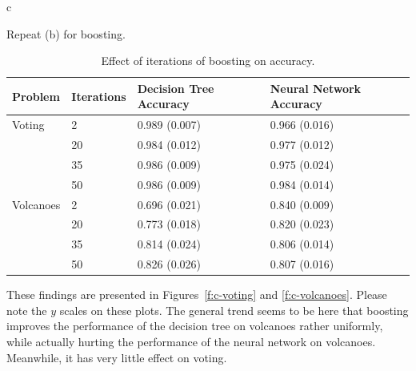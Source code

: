 \documentclass[fleqn]{homework}
\begin{document}
  \begin{problem}{c}
    \begin{question}
      Repeat (b) for boosting.
    \end{question}

    \begin{table}[h]
      \centering
      \caption{Effect of iterations of boosting on accuracy.}
      \label{t:c}
      \begin{tabular}{ll|ll}
        \toprule
        Problem   & Iterations & Decision Tree Accuracy & Neural Network Accuracy \\
        \midrule
        Voting    & 2          & 0.989 (0.007)          & 0.966 (0.016)            \\
                  & 20         & 0.984 (0.012)          & 0.977 (0.012)            \\
                  & 35         & 0.986 (0.009)          & 0.975 (0.024)            \\
                  & 50         & 0.986 (0.009)          & 0.984 (0.014)            \\
        \midrule
        Volcanoes & 2          & 0.696 (0.021)          & 0.840 (0.009)            \\
                  & 20         & 0.773 (0.018)          & 0.820 (0.023)            \\
                  & 35         & 0.814 (0.024)          & 0.806 (0.014)            \\
                  & 50         & 0.826 (0.026)          & 0.807 (0.016)            \\
        \bottomrule
      \end{tabular}
    \end{table}

    These findings are presented in Figures~\ref{f:c-voting} and
    \ref{f:c-volcanoes}.  Please note the $y$ scales on these plots.  The
    general trend seems to be here that boosting improves the performance of the
    decision tree on volcanoes rather uniformly, while actually hurting the
    performance of the neural network on volcanoes.  Meanwhile, it has very
    little effect on voting.


\end{problem}
\end{document}

